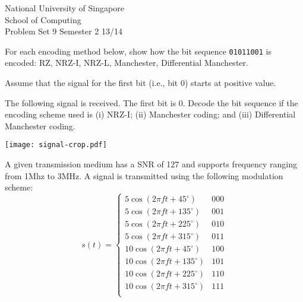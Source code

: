 \documentclass[a4paper,11pt]{exam}
\begin{document}
    \extraheadheight{.5in}
    {\large\sf National University of Singapore\\ School of Computing \\
    \LARGE\sf Problem Set 9}%
    {\large\sf Semester 2 13/14}
    \firstpageheadrule
    \pagestyle{headandfoot}

\begin{questions}
\question 
For each encoding method below, show how the bit sequence \texttt{01011001} is encoded: RZ, NRZ-I, NRZ-L, Manchester, Differential Manchester.  
	
Assume that the signal for the first bit (i.e., bit 0) starts at positive value.

\question 
The following signal is received.  The first bit is 0.  Decode the bit sequence if the encoding scheme used is (i) NRZ-I; (ii) Manchester coding; and (iii) Differential Manchester coding.  

\begin{center}
	\texttt{[image: signal-crop.pdf]}
\end{center}

\question A given transmission medium has a SNR of 127 and supports frequency ranging from 1Mhz to 3MHz.  A signal is transmitted using the following modulation scheme:
	\[
	s(t) = \left\{\begin{array}{lr}
		5 \cos(2\pi ft + 45^\circ)  & 000\\
		5 \cos(2\pi ft + 135^\circ)  & 001\\
		5 \cos(2\pi ft + 225^\circ)  & 010\\
		5 \cos(2\pi ft + 315^\circ)  & 011\\
		10 \cos(2\pi ft + 45^\circ)  & 100\\
		10 \cos(2\pi ft + 135^\circ)  & 101\\
		10 \cos(2\pi ft + 225^\circ)  & 110\\
		10 \cos(2\pi ft + 315^\circ)  & 111\\
	\end{array}
		\right.
		\]
\question 

\end{questions}
\end{document}
